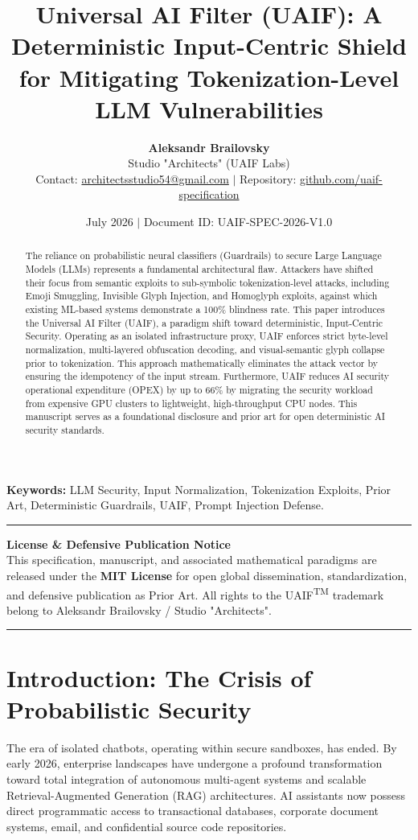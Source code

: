 \documentclass[10pt,a4paper]{article}
\title{\textbf{Universal AI Filter (UAIF): A Deterministic Input-Centric Shield for Mitigating Tokenization-Level LLM Vulnerabilities}}
\author{\textbf{Aleksandr Brailovsky}\\Studio "Architects" (UAIF Labs)\\
\small Contact: \href{mailto:architectsstudio54@gmail.com}{architectsstudio54@gmail.com} $|$ Repository: \href{https://github.com/uaif-specification}{github.com/uaif-specification}}
\date{July 2026 $|$ Document ID: UAIF-SPEC-2026-V1.0}
\begin{document}
\maketitle

\begin{abstract}
The reliance on probabilistic neural classifiers (Guardrails) to secure Large Language Models (LLMs) represents a fundamental architectural flaw. Attackers have shifted their focus from semantic exploits to sub-symbolic tokenization-level attacks, including Emoji Smuggling, Invisible Glyph Injection, and Homoglyph exploits, against which existing ML-based systems demonstrate a 100\% blindness rate. This paper introduces the Universal AI Filter (UAIF), a paradigm shift toward deterministic, Input-Centric Security. Operating as an isolated infrastructure proxy, UAIF enforces strict byte-level normalization, multi-layered obfuscation decoding, and visual-semantic glyph collapse prior to tokenization. This approach mathematically eliminates the attack vector by ensuring the idempotency of the input stream. Furthermore, UAIF reduces AI security operational expenditure (OPEX) by up to 66\% by migrating the security workload from expensive GPU clusters to lightweight, high-throughput CPU nodes. This manuscript serves as a foundational disclosure and prior art for open deterministic AI security standards.
\end{abstract}

\noindent\textbf{Keywords:} LLM Security, Input Normalization, Tokenization Exploits, Prior Art, Deterministic Guardrails, UAIF, Prompt Injection Defense.

\vspace{0.3cm}
\noindent\rule{\textwidth}{0.4pt}
\begin{center}
\small\textbf{License \& Defensive Publication Notice}\\
\small This specification, manuscript, and associated mathematical paradigms are released under the \textbf{MIT License} for open global dissemination, standardization, and defensive publication as Prior Art. All rights to the UAIF\textsuperscript{TM} trademark belong to Aleksandr Brailovsky / Studio "Architects".
\end{center}
\noindent\rule{\textwidth}{0.4pt}

\section{Introduction: The Crisis of Probabilistic Security}
The era of isolated chatbots, operating within secure sandboxes, has ended. By early 2026, enterprise landscapes have undergone a profound transformation toward total integration of autonomous multi-agent systems and scalable Retrieval-Augmented Generation (RAG) architectures. AI assistants now possess direct programmatic access to transactional databases, corporate document systems, email, and confidential source code repositories.
\end{document}
